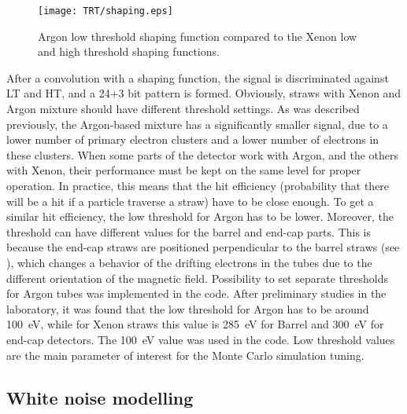 \begin{figure}
\begin{center}
 \texttt{[image: TRT/shaping.eps]}
\caption{Argon low threshold shaping function compared to the Xenon low and high threshold shaping functions.}
\label{fig:shaping}
\end{center}
\end{figure}


After a convolution with a shaping function, the signal is discriminated against LT and HT, and a 24+3 bit pattern is formed.
Obviously, straws with Xenon and Argon mixture should have different threshold settings.
As was described previously, the Argon-based mixture has a significantly smaller signal, due to a lower number of primary electron clusters and a lower number of electrons in these clusters.
When some parts of the detector work with Argon, and the others with Xenon, their performance must be kept on the same level for
proper operation. In practice, this means that the hit efficiency (probability that there will be a hit if a particle traverse a straw) have to be close enough. 
To get a similar hit efficiency, the low threshold for Argon has to be lower.
Moreover, the threshold can have different values for the barrel and end-cap parts. This is because the end-cap straws are positioned perpendicular to the barrel straws (see ), %
which changes a behavior of the drifting electrons in the tubes due to the different orientation of the magnetic field.
Possibility to set separate thresholds for Argon tubes was implemented in the code.
After preliminary studies in the laboratory, it was found that the low threshold for Argon has to be around 100~eV, 
while for Xenon straws this value is 285~eV for Barrel and 300~eV for end-cap detectors. The 100~eV value was used in the code.
Low threshold values are the main parameter of interest for the Monte Carlo simulation tuning.

\subsection{White noise modelling}

